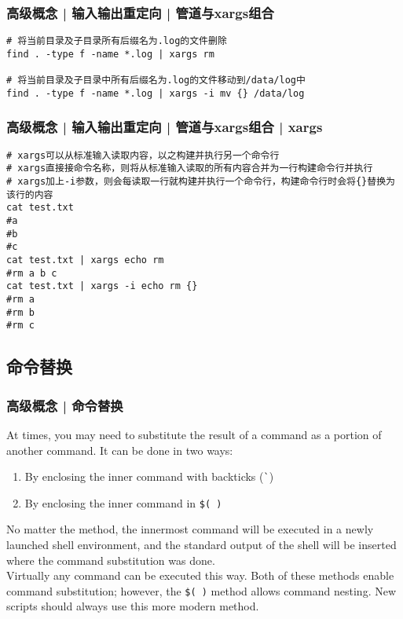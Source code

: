 \begin{frame}[fragile]
  \frametitle{高级概念 | 输入输出重定向 | 管道与xargs组合}
\begin{lstlisting}
# 将当前目录及子目录所有后缀名为.log的文件删除
find . -type f -name *.log | xargs rm

# 将当前目录及子目录中所有后缀名为.log的文件移动到/data/log中
find . -type f -name *.log | xargs -i mv {} /data/log
\end{lstlisting}
\end{frame}

\begin{frame}[fragile]
  \frametitle{高级概念 | 输入输出重定向 | 管道与xargs组合 | xargs}
  \vspace{-0.5em}
\begin{lstlisting}
# xargs可以从标准输入读取内容，以之构建并执行另一个命令行
# xargs直接接命令名称，则将从标准输入读取的所有内容合并为一行构建命令行并执行
# xargs加上-i参数，则会每读取一行就构建并执行一个命令行，构建命令行时会将{}替换为该行的内容
cat test.txt
#a
#b
#c
cat test.txt | xargs echo rm
#rm a b c
cat test.txt | xargs -i echo rm {}
#rm a
#rm b
#rm c
\end{lstlisting}
\end{frame}

\subsection{命令替换}
\begin{frame}[fragile]
  \frametitle{高级概念 | 命令替换}
  At times, you may need to substitute the result of a command as a portion of another command. It can be done in two ways:
  \begin{enumerate}
    \item By enclosing the inner command with backticks (\verb|`|)
    \item By enclosing the inner command in \verb|$( )|
  \end{enumerate}
  No matter the method, the innermost command will be executed in a newly launched shell environment, and the standard output of the shell will be inserted where the command substitution was done.\\
  \vspace{0.3cm}
  Virtually any command can be executed this way. Both of these methods enable command substitution; however, the \verb|$( )| method allows command nesting. New scripts should always use this more modern method.
\end{frame}

